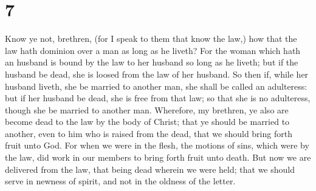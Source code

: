 \hypertarget{section-6}{%
\section{7}\label{section-6}}

 Know ye not, brethren, (for I speak to them that know the
law,) how that the law hath dominion over a man as long as he liveth?
 For the woman which hath an husband is bound by the law
to her husband so long as he liveth; but if the husband be dead, she is
loosed from the law of her husband.  So then if, while her
husband liveth, she be married to another man, she shall be called an
adulteress: but if her husband be dead, she is free from that law; so
that she is no adulteress, though she be married to another man.
 Wherefore, my brethren, ye also are become dead to the
law by the body of Christ; that ye should be married to another, even to
him who is raised from the dead, that we should bring forth fruit unto
God.  For when we were in the flesh, the motions of sins,
which were by the law, did work in our members to bring forth fruit unto
death.  But now we are delivered from the law, that being
dead wherein we were held; that we should serve in newness of spirit,
and not in the oldness of the letter.

